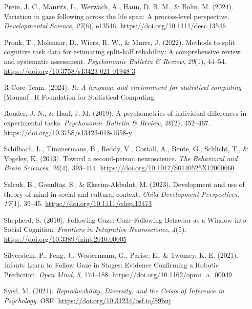 \documentclass[
  man,floatsintext]{apa7}
\newlength{\cslhangindent}
\newenvironment{CSLReferences}[2] %
 {\begin{list}{}{%
  \setlength{\itemindent}{0pt}
  \setlength{\leftmargin}{0pt}
  \setlength{\parsep}{0pt}
  \ifodd #1
   \setlength{\leftmargin}{\cslhangindent}
   \setlength{\itemindent}{-1\cslhangindent}
  \fi
  \setlength{\itemsep}{#2\baselineskip}}}
 {\end{list}}
\begin{document}
\begin{CSLReferences}{1}{0}
Prein, J. C., Maurits, L., Werwach, A., Haun, D. B. M., \& Bohn, M. (2024). Variation in gaze following across the life span: {A} process-level perspective. \emph{Developmental Science}, \emph{27}(6), e13546. \url{https://doi.org/10.1111/desc.13546}

Pronk, T., Molenaar, D., Wiers, R. W., \& Murre, J. (2022). Methods to split cognitive task data for estimating split-half reliability: {A} comprehensive review and systematic assessment. \emph{Psychonomic Bulletin \& Review}, \emph{29}(1), 44--54. \url{https://doi.org/10.3758/s13423-021-01948-3}

R Core Team. (2024). \emph{R: {A} language and environment for statistical computing} {[}Manual{]}. R Foundation for Statistical Computing.

Rouder, J. N., \& Haaf, J. M. (2019). A psychometrics of individual differences in experimental tasks. \emph{Psychonomic Bulletin \& Review}, \emph{26}(2), 452--467. \url{https://doi.org/10.3758/s13423-018-1558-y}

Schilbach, L., Timmermans, B., Reddy, V., Costall, A., Bente, G., Schlicht, T., \& Vogeley, K. (2013). Toward a second-person neuroscience. \emph{The Behavioral and Brain Sciences}, \emph{36}(4), 393--414. \url{https://doi.org/10.1017/S0140525X12000660}

Selcuk, B., Gonultas, S., \& Ekerim-Akbulut, M. (2023). Development and use of theory of mind in social and cultural context. \emph{Child Development Perspectives}, \emph{17}(1), 39--45. \url{https://doi.org/10.1111/cdep.12473}

Shepherd, S. (2010). Following {Gaze}: {Gaze-Following Behavior} as a {Window} into {Social Cognition}. \emph{Frontiers in Integrative Neuroscience}, \emph{4}(5). \url{https://doi.org/10.3389/fnint.2010.00005}

Silverstein, P., Feng, J., Westermann, G., Parise, E., \& Twomey, K. E. (2021). Infants {Learn} to {Follow Gaze} in {Stages}: {Evidence Confirming} a {Robotic Prediction}. \emph{Open Mind}, \emph{5}, 174--188. \url{https://doi.org/10.1162/opmi_a_00049}

Syed, M. (2021). \emph{Reproducibility, {Diversity}, and the {Crisis} of {Inference} in {Psychology}}. OSF. \url{https://doi.org/10.31234/osf.io/89buj}


\end{CSLReferences}
\end{document}
